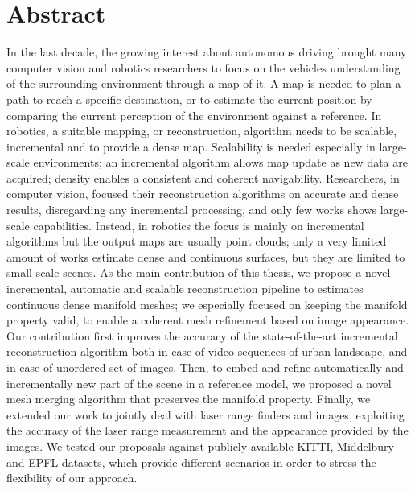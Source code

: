 \chapter*{Abstract}
\vspace{-5pt}

 

In the last decade, the growing interest about autonomous driving brought many computer vision and robotics researchers to focus on the  vehicles understanding of the surrounding environment through a map of it.
A map is needed to plan a path to reach a specific destination, or to estimate the current position by comparing the current perception of the environment against a reference.
In robotics, a suitable mapping, or reconstruction, algorithm needs  to be scalable, incremental and to provide a dense map. 
Scalability is needed especially in large-scale environments; an incremental algorithm allows map update as new data are acquired; density enables a consistent and coherent navigability.
Researchers, in computer vision, focused their reconstruction algorithms on accurate and dense results, disregarding any incremental processing, and only few works shows large-scale capabilities.  
Instead, in robotics the focus is mainly on incremental algorithms but the output maps are usually point clouds; only a very limited amount of works estimate dense and continuous surfaces, but they are limited to small scale scenes.
As the main contribution of this thesis, we propose a novel incremental, automatic and scalable reconstruction  pipeline to estimates continuous dense manifold meshes; we especially focused on keeping the manifold property valid, to enable a coherent mesh refinement based on image appearance.  
Our contribution first improves the accuracy of the state-of-the-art incremental reconstruction algorithm both in case of video sequences of urban landscape, and in case of unordered set of images.
Then, to embed and refine automatically and incrementally new part of the scene in a reference  model, we proposed a novel mesh merging algorithm that preserves the manifold property.
Finally, we extended our work to jointly deal with laser range finders and images, exploiting the accuracy of the laser range measurement and the appearance provided by the images.
We tested our proposals against publicly available KITTI, Middelbury and EPFL datasets, which provide different scenarios in order to stress the flexibility of our approach.

